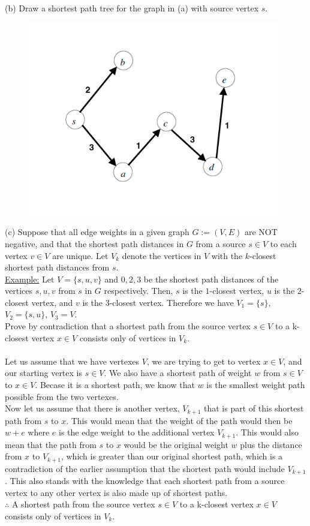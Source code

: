 \documentclass[11pt]{amsart}
\begin{document}
(b) Draw a shortest path tree for the graph in (a) with source vertex $s$.
\begin{figure}[htb]
\begin{center}
\includegraphics[width=11cm]{SPc}
\end{center}
\end{figure}

(c) Suppose that all edge weights in a given graph $G:=(V,E)$ are NOT negative, and that the shortest path distances in $G$ from a source $s\in V$ to each vertex $v\in V$ are unique. Let $V_k$ denote the vertices in $V$ with the $k$-closest shortest path distances from $s$.\\

\underline{Example:} Let $V=\{s, u, v\}$ and $0, 2, 3$ be the shortest path distances of the vertices  $s, u, v$ from $s$ in $G$ respectively. Then, $s$ is the $1$-closest vertex, $u$ is the $2$-closest vertex, and $v$ is the $3$-closest vertex. Therefore we have $V_1= \{s\}$, $V_2=\{s,u\}$, $V_3=V$.\\ 

Prove by contradiction that a shortest path from the source vertex $s\in V$ to a k-closest vertex $x\in V$ consists only of vertices in $V_k$.\\
\newpage
\hrulefill \\
Let us assume that we have vertexes $V$, we are trying to get to vertex $x \in V$, and our starting vertex is $s \in V$. We also have a shortest path of weight $w$ from $s \in V$ to $x \in V$. Becase it is a shortest path, we know that $w$ is the smallest weight path possible from the two vertexes.\\
Now let us assume that there is another vertex, $V_{k+1}$ that is part of this shortest path from $s$ to $x$. This would mean that the weight of the path would then be $w + e$ where $e$ is the edge weight to the additional vertex $V_{k+1}$. This would also mean that the path from $s$ to $x$ would be the original weight $w$ plus the distance from $x$ to $V_{k+1}$, which is greater than our original shortest path, which is a contradiction of the earlier assumption that the shortest path would include $V_{k+1}$. This also stands with the knowledge that each shortest path from a source vertex to any other vertex is also made up of shortest paths.\\
$\therefore$ A shortest path from the source vertex $s\in V$ to a k-closest vertex $x\in V$ consists only of vertices in $V_k$.
\end{document}
